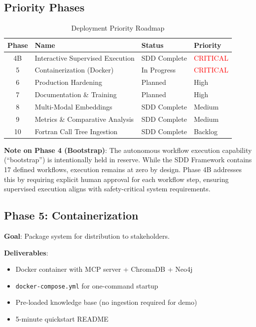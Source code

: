 \documentclass[11pt,letterpaper]{article}
\begin{document}
\subsection{Priority Phases}

\begin{table}[H]
\centering
\caption{Deployment Priority Roadmap}
\begin{tabular}{@{}clll@{}}
\toprule
\textbf{Phase} & \textbf{Name} & \textbf{Status} & \textbf{Priority} \\
\midrule
4B & Interactive Supervised Execution & SDD Complete & \textcolor{red}{CRITICAL} \\
5 & Containerization (Docker) & In Progress & \textcolor{red}{CRITICAL} \\
6 & Production Hardening & Planned & High \\
7 & Documentation \& Training & Planned & High \\
8 & Multi-Modal Embeddings & SDD Complete & Medium \\
9 & Metrics \& Comparative Analysis & SDD Complete & Medium \\
10 & Fortran Call Tree Ingestion & SDD Complete & Backlog \\
\bottomrule
\end{tabular}
\end{table}

\textbf{Note on Phase 4 (Bootstrap)}: The autonomous workflow execution capability (``bootstrap'') is intentionally held in reserve. While the SDD Framework contains 17 defined workflows, execution remains at zero by design. Phase 4B addresses this by requiring explicit human approval for each workflow step, ensuring supervised execution aligns with safety-critical system requirements.

\subsection{Phase 5: Containerization}

\textbf{Goal}: Package system for distribution to stakeholders.

\textbf{Deliverables}:
\begin{itemize}
    \item Docker container with MCP server + ChromaDB + Neo4j
    \item \texttt{docker-compose.yml} for one-command startup
    \item Pre-loaded knowledge base (no ingestion required for demo)
    \item 5-minute quickstart README
\end{itemize}
\end{document}
